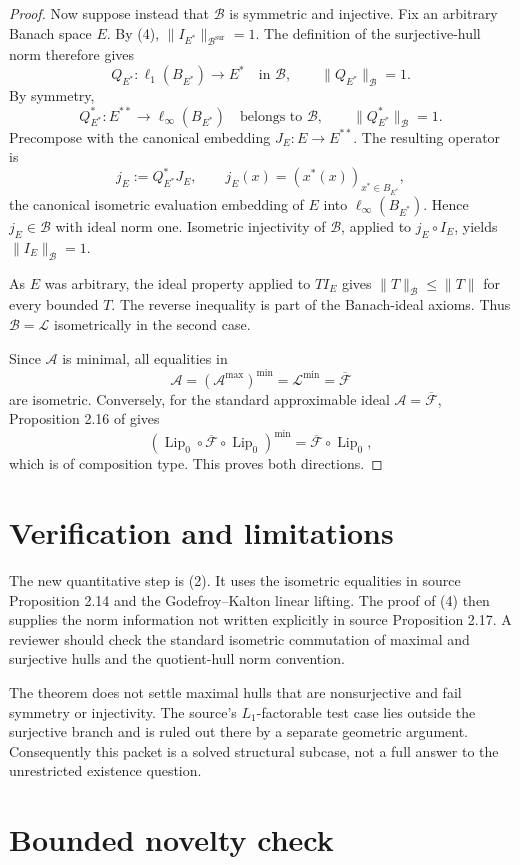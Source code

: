 \documentclass[11pt]{article}
\newcommand{\Lip}{\operatorname{Lip}_0}
\newcommand{\OF}{\overline{\mathcal F}}
\newcommand{\Lop}{\mathcal L}
\newcommand{\A}{\mathcal A}
\newcommand{\B}{\mathcal B}
\begin{document}
\begin{proof}
Now suppose instead that $\B$ is symmetric and injective. Fix an arbitrary
Banach space $E$. By (4), $\|I_{E^*}\|_{\B^{\mathrm{sur}}}=1$. The
definition of the surjective-hull norm therefore gives
\[
 Q_{E^*}:\ell_1(B_{E^*})\longrightarrow E^*
 \quad\text{in }\B,\qquad \|Q_{E^*}\|_{\B}=1.
\]
By symmetry,
\[
Q_{E^*}^*:E^{**}\longrightarrow \ell_\infty(B_{E^*})
 \quad\text{belongs to }\B,\qquad \|Q_{E^*}^*\|_{\B}=1.
\]
Precompose with the canonical embedding
$J_E:E\to E^{**}$. The resulting operator is
\[
 j_E:=Q_{E^*}^*J_E,
 \qquad j_E(x)=(x^*(x))_{x^*\in B_{E^*}},
\]
the canonical isometric evaluation embedding of $E$ into
$\ell_\infty(B_{E^*})$. Hence $j_E\in\B$ with ideal norm one. Isometric
injectivity of $\B$, applied to $j_E\circ I_E$, yields
$\|I_E\|_{\B}=1$.

As $E$ was arbitrary, the ideal property applied to $T I_E$ gives
$\|T\|_{\B}\leq\|T\|$ for every bounded $T$. The reverse inequality is part
of the Banach-ideal axioms. Thus $\B=\Lop$ isometrically in the second case.

Since $\A$ is minimal, all equalities in
\[
  \A=(\A^{\max})^{\min}=\Lop^{\min}=\OF
\]
are isometric.
Conversely, for the standard approximable ideal $\A=\OF$, Proposition 2.16
of \cite{AT} gives
\[
  (\Lip\circ\OF\circ\Lip)^{\min}=\OF\circ\Lip,
\]
which is of composition type. This proves both directions.
\end{proof}

\section{Verification and limitations}

The new quantitative step is (2). It uses the isometric equalities in source
Proposition 2.14 and the Godefroy--Kalton linear lifting. The proof of (4)
then supplies the norm information not written explicitly in source
Proposition 2.17. A reviewer should check the standard isometric commutation
of maximal and surjective hulls and the quotient-hull norm convention.

The theorem does not settle maximal hulls that are nonsurjective and fail
symmetry or injectivity. The source's $L_1$-factorable test case lies outside
the surjective branch and is ruled out there by a separate geometric
argument. Consequently this packet is a solved structural subcase, not a full
answer to the unrestricted existence question.

\section{Bounded novelty check}
\end{document}
